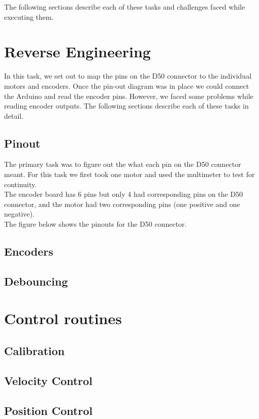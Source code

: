 \documentclass[10pt,a4paper]{article}
\begin{document}
The following sections describe each of these tasks and challenges
faced while executing them.

\section{Reverse Engineering}

In this task, we set out to map the pins on the D50 connector to the
individual motors and encoders. Once the pin-out diagram was in place
we could connect the Arduino and read the encoder pins. However, we
faced some problems while reading encoder outputs. The following
sections describe each of these tasks in detail. \\

\subsection{Pinout}
The primary task was to figure out the what each pin on the D50
connector meant. For this task we first took one motor and used the
multimeter to test for continuity. \\

The encoder board has 6 pins but only 4 had corresponding pins on the
D50 connector, and the motor had two corresponding pins (one positive
and one negative). \\

The figure below shows the pinouts for the D50 connector.
\subsection{Encoders}

\subsection{Debouncing}

\section{Control routines}

\subsection{Calibration}
\subsection{Velocity Control}
\subsection{Position Control}
\end{document}
